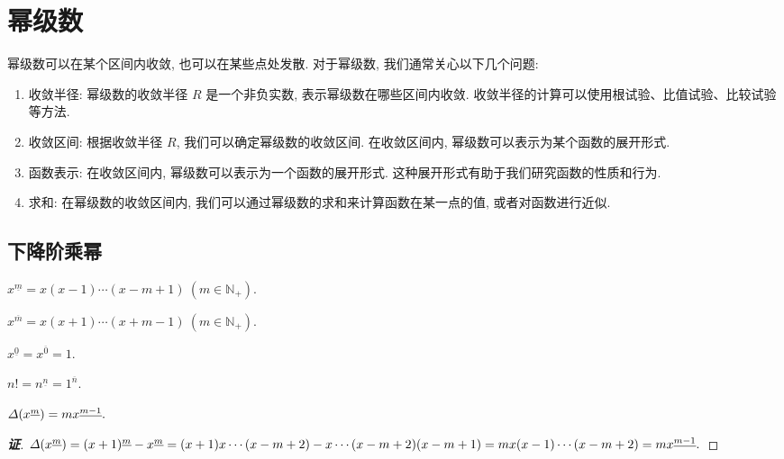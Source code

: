 \section{幂级数}

幂级数可以在某个区间内收敛, 也可以在某些点处发散. 对于幂级数, 我们通常关心以下几个问题:

\begin{enumerate}
    \item 收敛半径: 幂级数的收敛半径 $R$ 是一个非负实数, 表示幂级数在哪些区间内收敛. 收敛半径的计算可以使用根试验、比值试验、比较试验等方法.
    \item 收敛区间: 根据收敛半径 $R$, 我们可以确定幂级数的收敛区间. 在收敛区间内, 幂级数可以表示为某个函数的展开形式.
    \item 函数表示: 在收敛区间内, 幂级数可以表示为一个函数的展开形式. 这种展开形式有助于我们研究函数的性质和行为.
    \item 求和: 在幂级数的收敛区间内, 我们可以通过幂级数的求和来计算函数在某一点的值, 或者对函数进行近似.
\end{enumerate}

\subsection{下降阶乘幂}

\begin{definition}[下降阶乘幂]
    $x^{\underline{m} }=x(x-1)\cdots(x-m+1)~(m\in\mathbb{N}_+).$
\end{definition}

\begin{definition}[上升阶乘幂]
    $x^{\overline{m}}=x(x+1)\cdots(x+m-1)~(m\in\mathbb{N}_+).$
\end{definition}

\begin{definition}
    $x^{\underline{0}}=x^{\overline{0}}=1.$
\end{definition}

\begin{theorem}[阶乘与阶乘幂]
    $n!=n^{\underline{n}}=1^{\overline{n}}.$
\end{theorem}

\begin{theorem}
    $\varDelta \qty(x^{\underline{m}})=mx^{\underline{m-1}}.$
\end{theorem}
\begin{proof}[{\songti \textbf{证}}]
    $\varDelta\qty(x^{\underline{m}})=(x+1)^{\underline{m}}-x^{\underline{m}}=(x+1)x\cdots(x-m+2)-x\cdots(x-m+2)(x-m+1)=mx(x-1)\cdots(x-m+2)=mx^{\underline{m-1}}.$
\end{proof}

